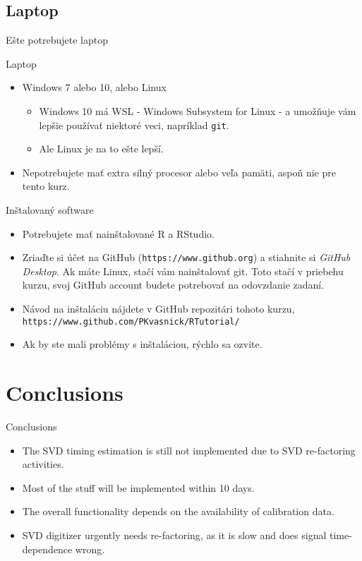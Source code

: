 \documentclass[9pt]{beamer}
\begin{document}
\subsection{Laptop}
\begin{frame}{Ešte potrebujete laptop}
	\begin{block}{Laptop}
		\begin{itemize}
			\item Windows 7 alebo 10, alebo Linux
			\begin{itemize}
				\item Windows 10 má WSL - Windows Subsystem for Linux - a umožňuje vám lepšie používať niektoré veci, napríklad \texttt{git}.
				\item Ale Linux je na to ešte lepší.
			\end{itemize}
			\item Nepotrebujete mať extra silný procesor alebo veľa pamäti, aspoň nie pre tento kurz.
		\end{itemize}
	\end{block}
	\begin{block}{Inštalovaný software}
		\begin{itemize}
			\item Potrebujete mať nainštalované R a RStudio.
			\item Zriaďte si účet na GitHub (\texttt{https://www.github.org}) a stiahnite si \emph{GitHub Desktop}. Ak máte Linux, stačí vám nainštalovať git. Toto stačí v priebehu kurzu, svoj GitHub account budete potrebovať na odovzdanie zadaní.
			\item Návod na inštaláciu nájdete v GitHub repozitári tohoto kurzu, \texttt{https://www.github.com/PKvasnick/RTutorial/}
			\item Ak by ste mali problémy s inštaláciou, rýchlo sa ozvite.
		\end{itemize}
	\end{block}
\end{frame}


\section{Conclusions}

\begin{frame}{Conclusions}
	\begin{itemize}
		\item The SVD timing estimation is still not implemented due to SVD re-factoring activities.
		\item Most of the stuff will be implemented within 10 days.
		\item The overall functionality depends on the availability of calibration data.
		\item SVD digitizer urgently needs re-factoring, as it is slow and does signal time-dependence wrong.
	\end{itemize}
\end{frame}
\end{document}
